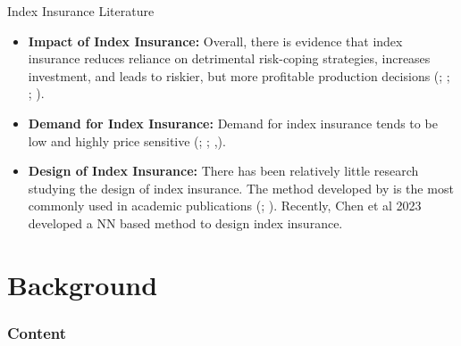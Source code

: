 \documentclass{beamer}
\begin{document}
\begin{frame}{Index Insurance Literature}
 \begin{itemize}
     \item \textbf{Impact of Index Insurance:} Overall, there is evidence that index insurance reduces reliance on detrimental risk-coping strategies, increases investment, and leads to riskier, but more profitable production decisions (\cite{jensen2017agricultural};  \cite{cole2013barriers}; \cite{mobarak2013informal}; \cite{karlan2014agricultural}).
     \item \textbf{Demand for Index Insurance:} Demand for index insurance tends to be low and highly price sensitive (\cite{jensen2017agricultural};  \cite{cole2013barriers}; \cite{cai2020subsidy},\cite{casaburi2018time}).
     \item \textbf{Design of Index Insurance:} There has been relatively little research studying the design of index insurance. The method developed by \cite{chantarat2013designing} is the most commonly used in academic publications (\cite{jensen2019does};  \cite{flatnes2018improving}). Recently, Chen et al 2023 developed a NN based method to design index insurance. 
 \end{itemize}
\end{frame}

     
\section{Background}
\begin{frame}
    \frametitle{Content}
    \tableofcontents[currentsection]
  \end{frame}
\end{document}
